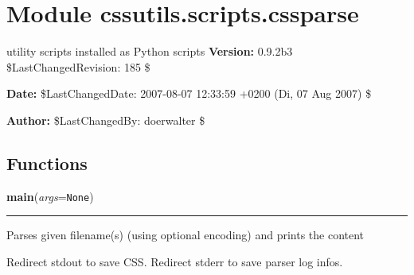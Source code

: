 %
%
%


\section{Module cssutils.scripts.cssparse}

    \label{cssutils:scripts:cssparse}

utility scripts installed as Python scripts
\textbf{Version:} 0.9.2b3 \$LastChangedRevision: 185 \$



\textbf{Date:} \$LastChangedDate: 2007-08-07 12:33:59 +0200 (Di, 07 Aug 2007) \$



\textbf{Author:} \$LastChangedBy: doerwalter \$





  \subsection{Functions}

    \label{cssutils:scripts:cssparse:main}

    \vspace{0.5ex}

\hspace{.8\funcindent}\begin{boxedminipage}{\funcwidth}

    \raggedright \textbf{main}(\textit{args}={\tt None})

    \vspace{-1.5ex}

    \rule{\textwidth}{0.5\fboxrule}
\setlength{\parskip}{2ex}

Parses given filename(s) (using optional encoding) and prints the content

Redirect stdout to save CSS. Redirect stderr to save parser log infos.
\setlength{\parskip}{1ex}
    \end{boxedminipage}

